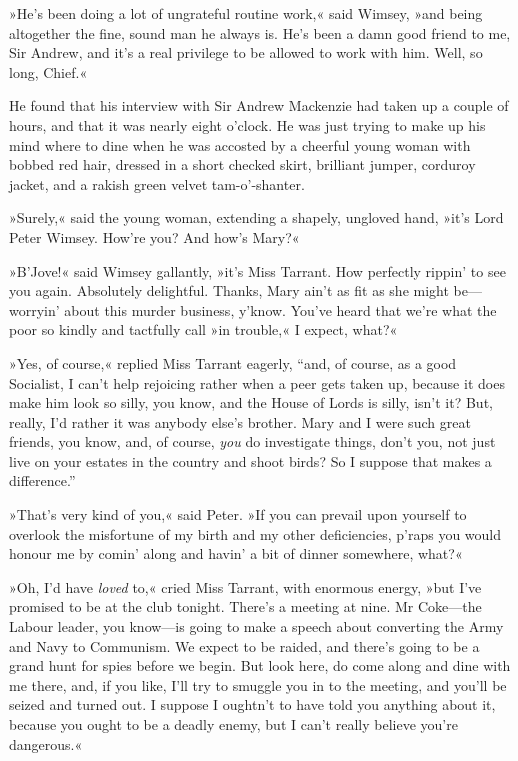 »He's been doing a lot of ungrateful routine work,« said Wimsey, »and being altogether the fine, sound man he always is. He's been a damn good friend to me, Sir Andrew, and it's a real privilege to be allowed to work with him. Well, so long, Chief.«

He found that his interview with Sir Andrew Mackenzie had taken up a couple of hours, and that it was nearly eight o'clock. He was just trying to make up his mind where to dine when he was accosted by a cheerful young woman with bobbed red hair, dressed in a short checked skirt, brilliant jumper, corduroy jacket, and a rakish green velvet tam-o'-shanter.

»Surely,« said the young woman, extending a shapely, ungloved hand, »it's Lord Peter Wimsey. How're you? And how's Mary?«

»B'Jove!« said Wimsey gallantly, »it's Miss Tarrant. How perfectly rippin' to see you again. Absolutely delightful. Thanks, Mary ain't as fit as she might be\allowbreak---\allowbreak worryin' about this murder business, y'know.  You've heard that we're what the poor so kindly and tactfully call »in trouble,« I expect, what?«

»Yes, of course,« replied Miss Tarrant eagerly, \enquote{and, of course, as a good Socialist, I can't help rejoicing rather when a peer gets taken up, because it does make him look so silly, you know, and the House of Lords is silly, isn't it? But, really, I'd rather it was anybody else's brother. Mary and I were such great friends, you know, and, of course, \textit{you} do investigate things, don't you, not just live on your estates in the country and shoot birds? So I suppose that makes a difference.}

»That's very kind of you,« said Peter. »If you can prevail upon yourself to overlook the misfortune of my birth and my other deficiencies, p'raps you would honour me by comin' along and havin' a bit of dinner somewhere, what?«

»Oh, I'd have \textit{loved} to,« cried Miss Tarrant, with enormous energy, »but I've promised to be at the club tonight. There's a meeting at nine. Mr Coke\allowbreak---\allowbreak the Labour leader, you know\allowbreak---\allowbreak is going to make a speech about converting the Army and Navy to Communism. We expect to be raided, and there's going to be a grand hunt for spies before we begin.  But look here, do come along and dine with me there, and, if you like, I'll try to smuggle you in to the meeting, and you'll be seized and turned out. I suppose I oughtn't to have told you anything about it, because you ought to be a deadly enemy, but I can't really believe you're dangerous.«

